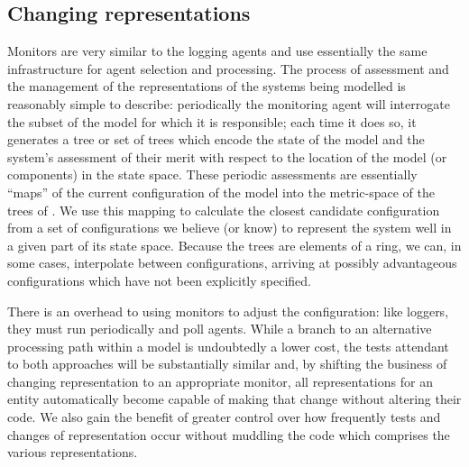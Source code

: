 \subsection{Changing representations}

Monitors are very similar to the logging agents and use essentially
the same infrastructure for agent selection and processing.  The
process of assessment and the management of the representations of the
systems being modelled is reasonably simple to describe: periodically
the monitoring agent will interrogate the subset of the model for
which it is responsible; each time it does so, it generates a tree or
set of trees which encode the state of the model and the system's
assessment of their merit with respect to the location of the model
(or components) in the state space.  These periodic assessments are
essentially ``maps'' of the current configuration of the model into
the metric-space of the trees of \Cfour.  We use this mapping to
calculate the closest candidate configuration from a set of
configurations we believe (or know) to represent the system well in a
given part of its state space. Because the trees are elements of a
ring, we can, in some cases, interpolate between configurations,
arriving at possibly advantageous configurations which have not been
explicitly specified.

There is an overhead to using monitors to adjust the configuration:
like loggers, they must run periodically and poll agents. While a
branch to an alternative processing path within a model is undoubtedly
a lower cost, the tests attendant to both approaches will be
substantially similar and, by shifting the business of changing
representation to an appropriate monitor, all representations for an
entity automatically become capable of making that change without
altering their code.  We also gain the benefit of greater control over
how frequently tests and changes of representation occur without
muddling the code which comprises the various representations.

